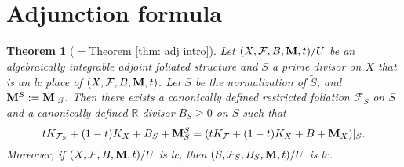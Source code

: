 \documentclass[12pt]{amsart}
\numberwithin{equation}{section}
\newcommand{\Mm}{{\bf{M}}}
\newcommand{\Rr}{\mathbb{R}}
\newcommand{\Ff}{\mathcal{F}}
\newtheorem{thm}{Theorem}[section]
\theoremstyle{definition}
\theoremstyle{definition}
\theoremstyle{definition}
\begin{document}
\section{Adjunction formula}\label{sec: an adjunction formula}

\begin{thm}[$=$Theorem \ref{thm: adj intro}]\label{thm: afs adj}
    Let $(X,\Ff,B,\Mm,t)/U$ be an algebraically integrable adjoint foliated structure and $\tilde S$ a prime divisor on $X$ that is an lc place of $(X,\Ff,B,\Mm,t)$. Let $S$ be the normalization of $\tilde S$, and $\Mm^S:=\Mm|_S$. Then there exists a canonically defined restricted foliation $\Ff_S$ on $S$ and a canonically defined $\Rr$-divisor $B_S\geq 0$ on $S$ such that
    $$tK_{\Ff_S}+(1-t)K_X+B_S+\Mm^S_S=(tK_{\Ff}+(1-t)K_X+B+\Mm_X)|_S.$$
Moreover, if $(X,\Ff,B,\Mm,t)/U$ is lc, then $(S,\Ff_S,B_S,\Mm,t)/U$ is lc.
\end{thm}
\end{document}
